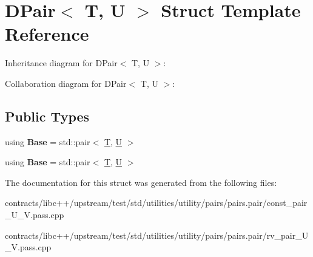 \hypertarget{struct_d_pair}{}\section{D\+Pair$<$ T, U $>$ Struct Template Reference}
\label{struct_d_pair}


Inheritance diagram for D\+Pair$<$ T, U $>$\+:


Collaboration diagram for D\+Pair$<$ T, U $>$\+:
\subsection*{Public Types}
\begin{DoxyCompactItemize}
\item 
\mbox{\label{struct_d_pair_a61f109645435b8e3d747c1ada5015b33}} 
using {\bfseries Base} = std\+::pair$<$ \mbox{\hyperlink{struct_t}{T}}, \mbox{\hyperlink{union_u}{U}} $>$
\item 
\mbox{\label{struct_d_pair_a61f109645435b8e3d747c1ada5015b33}} 
using {\bfseries Base} = std\+::pair$<$ \mbox{\hyperlink{struct_t}{T}}, \mbox{\hyperlink{union_u}{U}} $>$
\end{DoxyCompactItemize}


The documentation for this struct was generated from the following files\+:\begin{DoxyCompactItemize}
\item 
contracts/libc++/upstream/test/std/utilities/utility/pairs/pairs.\+pair/const\+\_\+pair\+\_\+\+U\+\_\+\+V.\+pass.\+cpp\item 
contracts/libc++/upstream/test/std/utilities/utility/pairs/pairs.\+pair/rv\+\_\+pair\+\_\+\+U\+\_\+\+V.\+pass.\+cpp\end{DoxyCompactItemize}
